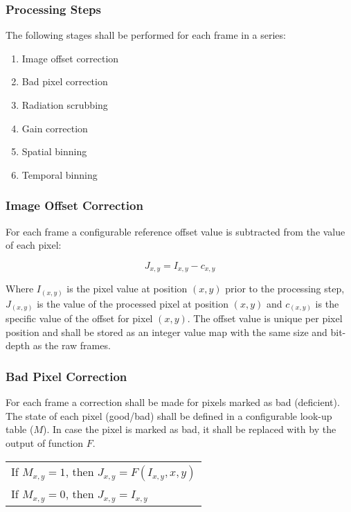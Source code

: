 \subsubsection{Processing Steps}
The following stages shall be performed for each frame in a series:

\begin{enumerate}
    \item Image offset correction
    \item Bad pixel correction
    \item Radiation scrubbing 
    \item Gain correction 
    \item Spatial binning 
    \item Temporal binning
\end{enumerate}

\subsubsection{Image Offset Correction}
For each frame a configurable reference offset value is subtracted from the value of each pixel:

\[J_{x,y} = I_{x,y} - c_{x,y}\]

Where \(I_(x,y)\) is the pixel value at position \((x,y)\) prior to the processing step, \(J_(x,y)\) is the value of the processed pixel at position \((x,y)\) and \(c_(x,y)\) is the specific value of the offset for pixel \((x,y)\). The offset value is unique per pixel position and shall be stored as an integer value map with the same size and bit-depth as the raw frames. 

\subsubsection{Bad Pixel Correction}
For each frame a correction shall be made for pixels marked as bad (deficient). The state of each pixel (good/bad) shall be defined in a configurable look-up table (\(M\)). In case the pixel is marked as bad, it shall be replaced with by the output of function \(F\). \\

\begin{center}
\begin{tabular}{l}
If \(M_{x,y} = 1\), then \(J_{x,y} = F(I_{x,y}, x, y)\) \\
If \(M_{x,y} = 0\), then \(J_{x,y} = I_{x,y}\) \\
\end{tabular}
\end{center}

